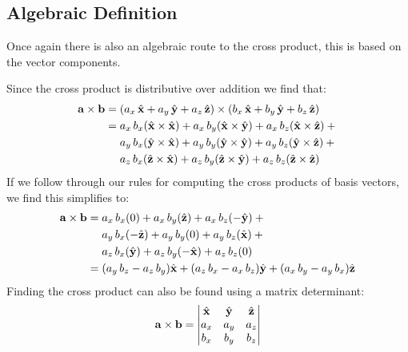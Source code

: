 \documentclass[letterpaper,10pt,english]{jupyterBook}
\begin{document}
\subsection{Algebraic Definition}
\label{\detokenize{VectorCalculus/vectoralgebra:id1}}
\sphinxAtStartPar
Once again there is also an algebraic route to the cross product, this is based on the vector components.

\sphinxAtStartPar
Since the cross product is distributive over addition we find that:
\begin{equation*}
\begin{split} \mathbf{a}\times\mathbf{b} = {} &(a_x\,\hat{\bf x} + a_y\,\hat{\bf y} + a_z\,\hat{\bf z}) \times (b_x\,\hat{\bf x} + b_y\,\hat{\bf y} + b_z\,\hat{\bf z})\\
                            = {} &a_x\,b_x(\hat{\bf x} \times \hat{\bf x}) + a_x\,b_y(\hat{\bf x} \times \hat{\bf y}) + a_x\,b_z(\hat{\bf x} \times \hat{\bf z}) + {}\\
                                 &a_y\,b_x(\hat{\bf y} \times \hat{\bf x}) + a_y\,b_y(\hat{\bf y} \times \hat{\bf y}) + a_y\,b_z(\hat{\bf y} \times \hat{\bf z}) + {}\\
                                 &a_z\,b_x(\hat{\bf z} \times \hat{\bf x}) + a_z\,b_y(\hat{\bf z} \times \hat{\bf y}) + a_z\,b_z(\hat{\bf z} \times \hat{\bf z})\\\end{split}
\end{equation*}
\sphinxAtStartPar
If we follow through our rules for computing the cross products of basis vectors, we find this simplifies to:
\begin{equation*}
\begin{split} \mathbf{a}\times\mathbf{b} = {} &a_x\,b_x(0) + a_x\,b_y(\hat{\bf z}) + a_x\,b_z(-\hat{\bf y}) + {}\\
                                 &a_y\,b_x(-\hat{\bf z}) + a_y\,b_y(0) + a_y\,b_z(\hat{\bf x}) + {}\\
                                 &a_z\,b_x(\hat{\bf y}) + a_z\,b_y(-\hat{\bf x}) + a_z\,b_z(0)\\
							= {} &(a_y\,b_z - a_z\,b_y)\hat{\bf x} + (a_z\,b_x - a_x\,b_z)\hat{\bf y} + (a_x\,b_y - a_y\,b_x)\hat{\bf z} \end{split}
\end{equation*}
\sphinxAtStartPar
Finding the cross product can also be found using a matrix determinant:
\begin{equation*}
\begin{split} \mathbf{a}\times\mathbf{b} = \begin{vmatrix}
 \hat{\bf x} & \hat{\bf y} & \hat{\bf z} \\
 a_x & a_y & a_z \\
 b_x & b_y & b_z
\end{vmatrix}\end{split}
\end{equation*}
\end{document}
